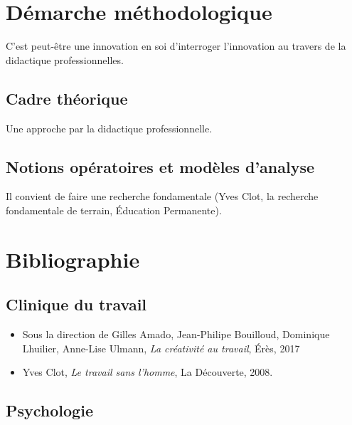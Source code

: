 \documentclass{article}
\begin{document}
\section{Démarche méthodologique}

C'est peut-être une innovation en soi d'interroger l'innovation au travers de la didactique professionnelles. 

\subsection{Cadre théorique}

Une approche par la didactique professionnelle.

\subsection{Notions opératoires et modèles d'analyse}

Il convient de faire une recherche fondamentale (Yves Clot, la recherche fondamentale de terrain, Éducation Permanente).

\section{Bibliographie}

\subsection{Clinique du travail}

\begin{itemize}

\item Sous la direction de Gilles Amado, Jean-Philipe Bouilloud, Dominique Lhuilier, Anne-Lise Ulmann, \textit{La créativité au travail}, Érès, 2017
\item Yves Clot, \textit{Le travail sans l’homme}, La Découverte, 2008.

\end{itemize}

\subsection{Psychologie}
\end{document}
